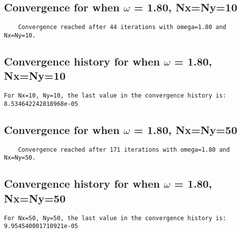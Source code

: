 \documentclass[a4paper, twoside]{article}
\begin{document}
\subsection{Convergence for when $\omega$ = 1.80, Nx=Ny=10}
\begin{lstlisting}
    Convergence reached after 44 iterations with omega=1.80 and Nx=Ny=10.
\end{lstlisting}

\subsection{Convergence history for when $\omega$ = 1.80, Nx=Ny=10}
\begin{lstlisting}
For Nx=10, Ny=10, the last value in the convergence history is:
8.534642242818968e-05
\end{lstlisting}

\subsection{Convergence for when $\omega$ = 1.80, Nx=Ny=50}
\begin{lstlisting}
    Convergence reached after 171 iterations with omega=1.80 and Nx=Ny=50.
\end{lstlisting}

\subsection{Convergence history for when $\omega$ = 1.80, Nx=Ny=50}
\begin{lstlisting}
For Nx=50, Ny=50, the last value in the convergence history is:
9.954540001710921e-05
\end{lstlisting}
\end{document}
